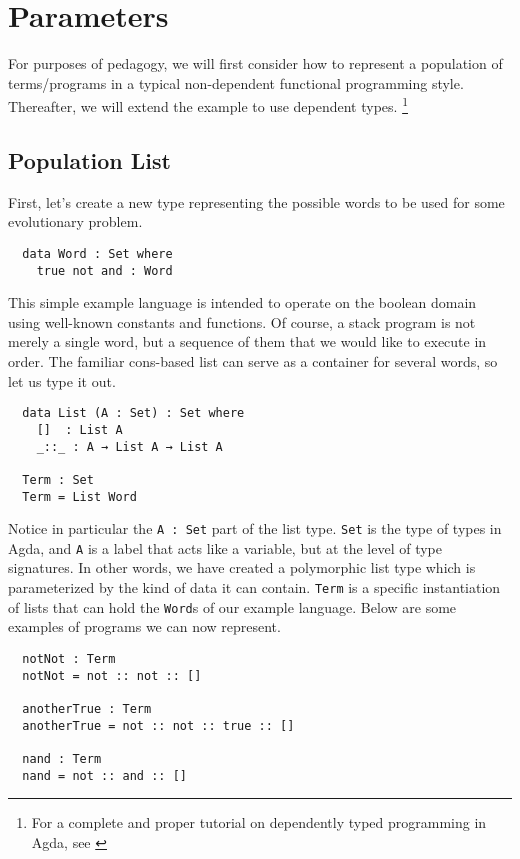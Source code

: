 \documentclass[runningheads,a4paper]{llncs}
\begin{document}
\section{Parameters}

For purposes of pedagogy, we will first consider how to represent a
population of terms/programs in a typical non-dependent functional
programming style. Thereafter, we will extend the example to use
dependent types.
\footnote{For a complete and proper tutorial on dependently typed programming in Agda, see \cite{norell:agdatut}}

\subsection{Population List}

First, let's create a new type representing the possible words to be
used for some evolutionary problem.

\begin{verbatim}
  data Word : Set where
    true not and : Word
\end{verbatim}

This simple example language is intended to operate on the boolean domain using
well-known constants and functions. Of course, a stack program is not
merely a single word, but a sequence of them that we would like to
execute in order. The familiar cons-based list can serve as a
container for several words, so let us type it out.

\begin{verbatim}
  data List (A : Set) : Set where
    []  : List A
    _::_ : A → List A → List A

  Term : Set
  Term = List Word
\end{verbatim}

Notice in particular the \texttt{A : Set} part of the list
type. \texttt{Set} is the type of types in Agda, and \texttt{A} is
a label that acts like a variable, but at the level of type
signatures. In other words, we have created a polymorphic list type
which is parameterized by the kind of data it can
contain. \texttt{Term} is a specific instantiation of lists that can
hold the \texttt{Word}s of our example language. Below are some
examples of programs we can now represent.

\begin{verbatim}
  notNot : Term
  notNot = not :: not :: []

  anotherTrue : Term
  anotherTrue = not :: not :: true :: []

  nand : Term
  nand = not :: and :: []
\end{verbatim}
\end{document}
